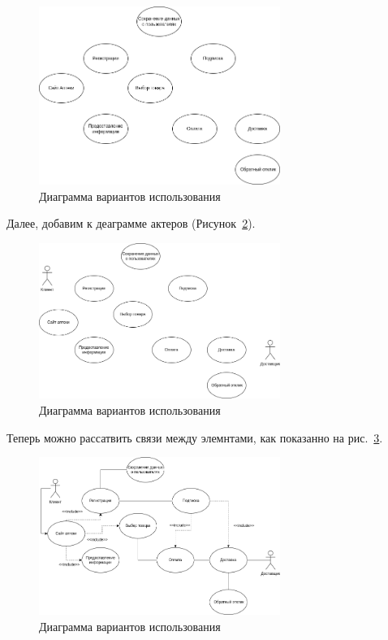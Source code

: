 \begin{figure}[h!tp]
	\centering
	\includegraphics[width=0.7\textwidth]{use_case_diagram}
	\caption{Диаграмма вариантов использования}
	\label{fig:use_case_diagram}
\end{figure}

\newpage
Далее, добавим к деаграмме актеров
(Рисунок~\ref{fig:use_case_diagram_with_acter}).

\begin{figure}[h!tp]
	\centering
	\includegraphics[width=0.7\textwidth]{use_case_diagram_with_acter}
	\caption{Диаграмма вариантов использования}
	\label{fig:use_case_diagram_with_acter}
\end{figure}

Теперь можно рассатвить связи между элемнтами,
как показанно на рис.~\ref{fig:use_case_complite}.

\begin{figure}[h!tp]
	\centering
	\includegraphics[width=0.7\textwidth]{use_case_complite}
	\caption{Диаграмма вариантов использования}
	\label{fig:use_case_complite}
\end{figure}

